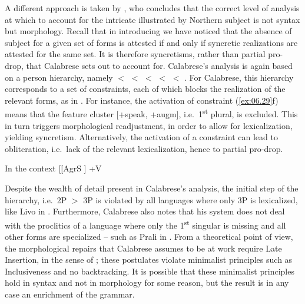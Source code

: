 \documentclass[output=paper]{langsci/langscibook}
\begin{document}
A different approach is taken by \citet{Calabrese2008}, who concludes that the
correct level of analysis at which to account for the intricate 
illustrated by Northern  subject  is not syntax but morphology.
Recall that in introducing  we have noticed that the
absence of subject  for a given set of forms is attested if and only if
syncretic realizations are attested for the same set. It is therefore
syncretisms, rather than partial pro-drop, that Calabrese sets out to account
for. Calabrese’s analysis is again based on a person hierarchy, namely \Ssg{}
$<$ \Tsg{} $<$ \Tpl{} $<$ \Fsg{} $<$ \Spl{} $<$ \Fpl{}. For Calabrese, this hierarchy corresponds to a set
of constraints, each of which blocks the realization of the relevant forms, as
in . For instance, the activation of constraint (\ref{ex:06.29}f)
means that the feature cluster [+speak, +augm], i.e.\ 1\textsuperscript{st}
plural, is excluded. This in turn triggers morphological readjustment, in order
to allow for lexicalization, yielding syncretism. Alternatively, the activation
of a constraint can lead to obliteration, i.e.\ lack of the relevant
lexicalization, hence to partial pro-drop.

\ea%
    \label{ex:06.29} In the context [[AgrS \underline{\hspace{2em}} ] +V
     \tab{\Ssg{}}
             \tab{\Tsg{}}
             \tab{\Tpl{}}
            \tab{\Fsg{}}
     \tab{\Spl{}}
            \tab{\Fpl{}}
    \z
\z

Despite the wealth of detail present in Calabrese’s analysis, the initial step
of the hierarchy, i.e.\ 2P $>$ 3P is violated by all languages where only 3P is
lexicalized, like Livo in . Furthermore, Calabrese also
notes that his system does not deal with the proclitics of a language where
only the 1\textsuperscript{st} singular is missing and all other forms are
specialized – such as Prali in . From a theoretical point
of view, the morphological repairs that Calabrese assumes to be at work require
Late Insertion, in the sense of ; these postulates
violate minimalist principles such as Inclusiveness and no backtracking. It is
possible that these minimalist principles hold in syntax and not in morphology
for some reason, but the result is in any case an enrichment of the grammar.
\end{document}
